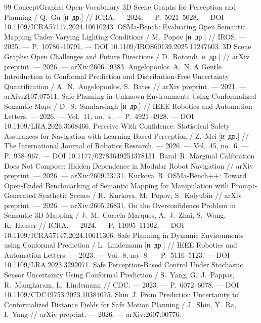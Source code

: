 \documentclass[conference,a4paper]{IEEEtran}
\theoremstyle{definition}
\begin{document}
\begin{thebibliography}{99}
\footnotesize
{} ConceptGraphs: Open-Vocabulary 3D Scene Graphs for Perception and Planning / Q.~Gu [и~др.] // ICRA. --- 2024. --- P.~5021--5028. --- DOI 10.1109/ICRA57147.2024.10610243.
 OSMa-Bench: Evaluating Open Semantic Mapping Under Varying Lighting Conditions / M.~Popov [и~др.] // IROS. --- 2025. --- P.~10786--10791. --- DOI 10.1109/IROS60139.2025.11247603.
 3D Scene Graphs: Open Challenges and Future Directions / D.~Rotondi [и~др.] // arXiv preprint. --- 2026. --- arXiv:2606.19383.
 Angelopoulos~A.~N. A Gentle Introduction to Conformal Prediction and Distribution-Free Uncertainty Quantification / A.~N.~Angelopoulos, S.~Bates // arXiv preprint. --- 2021. --- arXiv:2107.07511.
 Safe Planning in Unknown Environments Using Conformalized Semantic Maps / D.~S.~Sundarsingh [и~др.] // IEEE Robotics and Automation Letters. --- 2026. --- Vol.~11, no.~4. --- P.~4921--4928. --- DOI 10.1109/LRA.2026.3668466.
 Perceive With Confidence: Statistical Safety Assurances for Navigation with Learning-Based Perception / Z.~Mei [и~др.] // The International Journal of Robotics Research. --- 2026. --- Vol.~45, no.~6. --- P.~938--967. --- DOI 10.1177/02783649251378151.
 Baral~R. Marginal Calibration Does Not Compose: Hidden Dependence in Modular Robot Navigation // arXiv preprint. --- 2026. --- arXiv:2609.23731.
 Kurkova~R. OSMa-Bench++: Toward Open-Ended Benchmarking of Semantic Mapping for Manipulation with Prompt-Generated Synthetic Scenes / R.~Kurkova, M.~Popov, S.~Kolyubin // arXiv preprint. --- 2026. --- arXiv:2605.26831.
 On the Overconfidence Problem in Semantic 3D Mapping / J.~M.~Correia Marques, A.~J.~Zhai, S.~Wang, K.~Hauser // ICRA. --- 2024. --- P.~11095--11102. --- DOI 10.1109/ICRA57147.2024.10611306.
 Safe Planning in Dynamic Environments using Conformal Prediction / L.~Lindemann [и~др.] // IEEE Robotics and Automation Letters. --- 2023. --- Vol.~8, no.~8. --- P.~5116--5123. --- DOI 10.1109/LRA.2023.3292071.
 Safe Perception-Based Control Under Stochastic Sensor Uncertainty Using Conformal Prediction / S.~Yang, G.~J.~Pappas, R.~Mangharam, L.~Lindemann // CDC. --- 2023. --- P.~6072--6078. --- DOI 10.1109/CDC49753.2023.10384075.
 Shin~J. From Prediction Uncertainty to Conformalized Distance Fields for Safe Motion Planning / J.~Shin, Y.~Ra, I.~Yang // arXiv preprint. --- 2026. --- arXiv:2607.00776.

\end{thebibliography}
\end{document}
